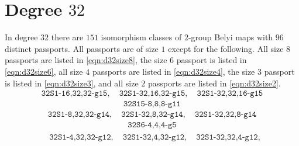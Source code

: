 \documentclass{dcthesis}
\numberwithin{equation}{section}
\theoremstyle{definition}
\theoremstyle{remark}
\begin{document}
{{  \section{Degree $32$}{
    \label{sec:d32}
    In degree $32$ there are $151$
    isomorphism classes of $2$-group Belyi maps
    with $96$ distinct passports.
    All passports are of size $1$
    except for the following.
    All size $8$ passports are
    listed in
    \eqref{eqn:d32size8},
    the size $6$ passport is
    listed in
    \eqref{eqn:d32size6},
    all size $4$ passports are
    listed in
    \eqref{eqn:d32size4},
    the size $3$ passport is
    listed in
    \eqref{eqn:d32size3},
    and
    all size $2$ passports are
    listed in
    \eqref{eqn:d32size2}.
    \begin{align}
      \label{eqn:d32size8}
      \texttt{32S1-16,32,32-g15},\quad
      \texttt{32S1-32,16,32-g15},\quad
      \texttt{32S1-32,32,16-g15}
    \end{align}
    \begin{align}
      \label{eqn:d32size6}
      \texttt{32S15-8,8,8-g11}
    \end{align}
    \begin{align}
      \label{eqn:d32size4}
      \texttt{32S1-8,32,32-g14},\quad
      \texttt{32S1-32,8,32-g14},\quad
      \texttt{32S1-32,32,8-g14}
    \end{align}
    \begin{align}
      \label{eqn:d32size3}
      \texttt{32S6-4,4,4-g5}
    \end{align}
    \begin{align}
      \label{eqn:d32size2}
      \begin{split}
        &\texttt{32S1-4,32,32-g12},\quad
        \texttt{32S1-32,4,32-g12},\quad
        \texttt{32S1-32,32,4-g12},\\

\end{split}
\end{align}}}}
\end{document}

